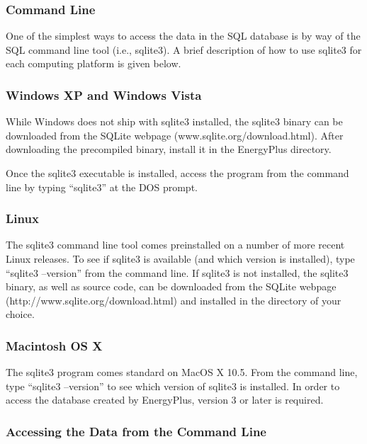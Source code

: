 \subsubsection{Command Line}\label{command-line}

One of the simplest ways to access the data in the SQL database is by way of the SQL command line tool (i.e., sqlite3). A brief description of how to use sqlite3 for each computing platform is given below.

\subsubsection{Windows XP and Windows Vista}\label{windows-xp-and-windows-vista}

While Windows does not ship with sqlite3 installed, the sqlite3 binary can be downloaded from the SQLite webpage (www.sqlite.org/download.html). After downloading the precompiled binary, install it in the EnergyPlus directory.

Once the sqlite3 executable is installed, access the program from the command line by typing ``sqlite3'' at the DOS prompt.

\subsubsection{Linux}\label{linux}

The sqlite3 command line tool comes preinstalled on a number of more recent Linux releases. To see if sqlite3 is available (and which version is installed), type ``sqlite3 --version'' from the command line. If sqlite3 is not installed, the sqlite3 binary, as well as source code, can be downloaded from the SQLite webpage (http://www.sqlite.org/download.html) and installed in the directory of your choice.

\subsubsection{Macintosh OS X}\label{macintosh-os-x}

The sqlite3 program comes standard on MacOS X 10.5. From the command line, type ``sqlite3 --version'' to see which version of sqlite3 is installed. In order to access the database created by EnergyPlus, version 3 or later is required.

\subsubsection{Accessing the Data from the Command Line}\label{accessing-the-data-from-the-command-line}

